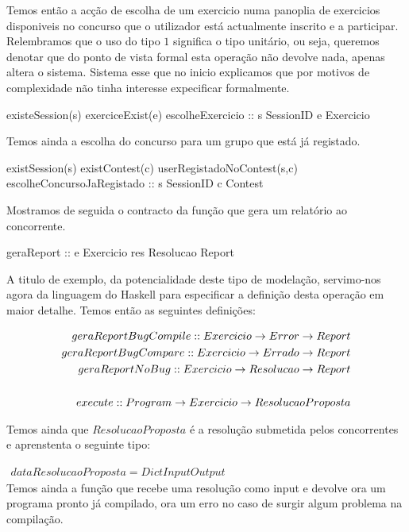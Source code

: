 Temos então a acção de escolha de um exercicio numa panoplia de exercicios disponiveis no concurso que o utilizador está actualmente inscrito e a participar.\\
Relembramos que o uso do tipo $1$ significa o tipo unitário, ou seja, queremos denotar que do ponto de vista formal esta operação não devolve nada, apenas altera o sistema.
Sistema esse que no inicio explicamos que por motivos de complexidade não tinha interesse expecificar formalmente.

\prop
{ existeSession(s) \wedge exerciceExist(e) }
{escolheExercicio :: s \unif SessionID \rarrow e \unif Exercicio }
{ }

Temos ainda a escolha do concurso para um grupo que está já registado.

\prop
{ existSession(s) \wedge existContest(c) \wedge userRegistadoNoContest(s,c) }
{escolheConcursoJaRegistado :: s \unif SessionID \rarrow c \unif Contest }
{ }

Mostramos de seguida o contracto da função que gera um relatório ao concorrente.

\prop
{ }
{geraReport :: e \unif Exercicio \rarrow res \unif Resolucao \rarrow Report}
{ }

A titulo de exemplo, da potencialidade deste tipo de modelação, servimo-nos agora da linguagem do Haskell para especificar a definição desta operação em maior detalhe.
Temos então as seguintes definições:

\begin{eqnarray*}
geraReportBugCompile :: Exercicio \rightarrow Error \rightarrow Report\\
geraReportBugCompare :: Exercicio \rightarrow Errado \rightarrow Report\\
geraReportNoBug :: Exercicio \rightarrow Resolucao \rightarrow Report\\
\\
execute :: Program \rightarrow Exercicio \rightarrow ResolucaoProposta\\
\end{eqnarray*}

Temos ainda que $ResolucaoProposta$ é a resolução submetida pelos concorrentes e aprenstenta o seguinte tipo:

$\begin{array}{l}
data ResolucaoProposta = Dict Input Output
\end{array}$\\

Temos ainda a função que recebe uma resolução como input e devolve ora um programa pronto já compilado, ora um erro no caso de surgir algum problema na compilação.

